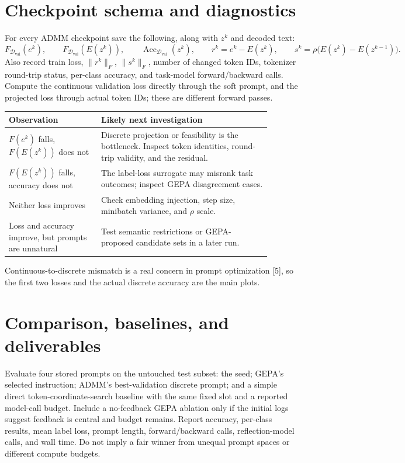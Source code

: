 \documentclass[11pt]{article}
\newcommand{\D}{\mathcal D}
\newcommand{\acc}{\operatorname{Acc}}
\begin{document}
\section{Checkpoint schema and diagnostics}
For every ADMM checkpoint save the following, along with $z^k$ and decoded text:
\begin{equation}
F_{\D_{\mathrm{val}}}(e^k),\qquad
F_{\D_{\mathrm{val}}}(E(z^k)),\qquad
\acc_{\D_{\mathrm{val}}}(z^k),\qquad
r^k=e^k-E(z^k),\qquad
s^k=\rho\bigl(E(z^k)-E(z^{k-1})\bigr).
\label{eq:diagnostics}
\end{equation}
Also record train loss, $\|r^k\|_F$, $\|s^k\|_F$, number of changed token IDs, tokenizer round-trip status, per-class accuracy, and task-model forward/backward calls. Compute the continuous validation loss directly through the soft prompt, and the projected loss through actual token IDs; these are different forward passes.

\begin{center}
\begin{tabular}{p{0.31\linewidth}p{0.58\linewidth}}
\toprule
Observation & Likely next investigation\\
\midrule
$F(e^k)$ falls, $F(E(z^k))$ does not & Discrete projection or feasibility is the bottleneck. Inspect token identities, round-trip validity, and the residual.\\
$F(E(z^k))$ falls, accuracy does not & The label-loss surrogate may misrank task outcomes; inspect GEPA disagreement cases.\\
Neither loss improves & Check embedding injection, step size, minibatch variance, and $\rho$ scale.\\
Loss and accuracy improve, but prompts are unnatural & Test semantic restrictions or GEPA-proposed candidate sets in a later run.\\
\bottomrule
\end{tabular}
\end{center}
Continuous-to-discrete mismatch is a real concern in prompt optimization [5], so the first two losses and the actual discrete accuracy are the main plots.

\section{Comparison, baselines, and deliverables}
Evaluate four stored prompts on the untouched test subset: the seed; GEPA's selected instruction; ADMM's best-validation discrete prompt; and a simple direct token-coordinate-search baseline with the same fixed slot and a reported model-call budget. Include a no-feedback GEPA ablation only if the initial logs suggest feedback is central and budget remains. Report accuracy, per-class results, mean label loss, prompt length, forward/backward calls, reflection-model calls, and wall time. Do not imply a fair winner from unequal prompt spaces or different compute budgets.
\end{document}

